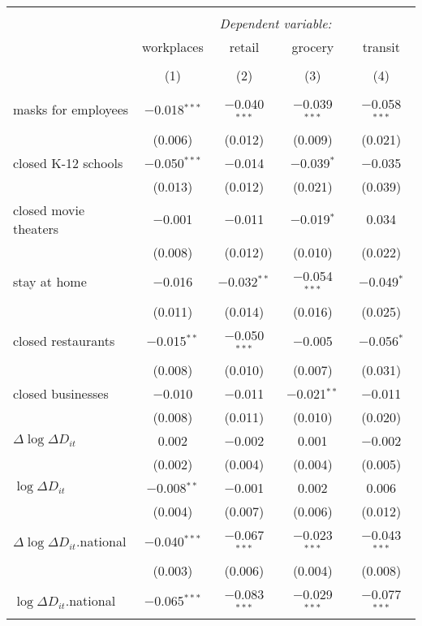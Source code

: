\begin{tabular}{@{\extracolsep{1pt}}lcccc} 
\\[-1.8ex]\hline 
\hline \\[-1.8ex] 
 & \multicolumn{4}{c}{\textit{Dependent variable:}} \\ 
\cline{2-5} 
 & workplaces & retail & grocery & transit \\ 
\\[-1.8ex] & (1) & (2) & (3) & (4)\\ 
\hline \\[-1.8ex] 
 masks for employees & $-$0.018$^{***}$ & $-$0.040$^{***}$ & $-$0.039$^{***}$ & $-$0.058$^{***}$ \\ 
  & (0.006) & (0.012) & (0.009) & (0.021) \\ 
  closed K-12 schools & $-$0.050$^{***}$ & $-$0.014 & $-$0.039$^{*}$ & $-$0.035 \\ 
  & (0.013) & (0.012) & (0.021) & (0.039) \\ 
  closed movie theaters & $-$0.001 & $-$0.011 & $-$0.019$^{*}$ & 0.034 \\ 
  & (0.008) & (0.012) & (0.010) & (0.022) \\ 
  stay at home & $-$0.016 & $-$0.032$^{**}$ & $-$0.054$^{***}$ & $-$0.049$^{*}$ \\ 
  & (0.011) & (0.014) & (0.016) & (0.025) \\ 
  closed restaurants & $-$0.015$^{**}$ & $-$0.050$^{***}$ & $-$0.005 & $-$0.056$^{*}$ \\ 
  & (0.008) & (0.010) & (0.007) & (0.031) \\ 
  closed businesses & $-$0.010 & $-$0.011 & $-$0.021$^{**}$ & $-$0.011 \\ 
  & (0.008) & (0.011) & (0.010) & (0.020) \\ 
  $\Delta \log \Delta D_{it}$ & 0.002 & $-$0.002 & 0.001 & $-$0.002 \\ 
  & (0.002) & (0.004) & (0.004) & (0.005) \\ 
  $\log \Delta D_{it}$ & $-$0.008$^{**}$ & $-$0.001 & 0.002 & 0.006 \\ 
  & (0.004) & (0.007) & (0.006) & (0.012) \\ 
  $\Delta \log \Delta D_{it}$.national & $-$0.040$^{***}$ & $-$0.067$^{***}$ & $-$0.023$^{***}$ & $-$0.043$^{***}$ \\ 
  & (0.003) & (0.006) & (0.004) & (0.008) \\ 
  $\log \Delta D_{it}$.national & $-$0.065$^{***}$ & $-$0.083$^{***}$ & $-$0.029$^{***}$ & $-$0.077$^{***}$ \\ 

\end{tabular}

